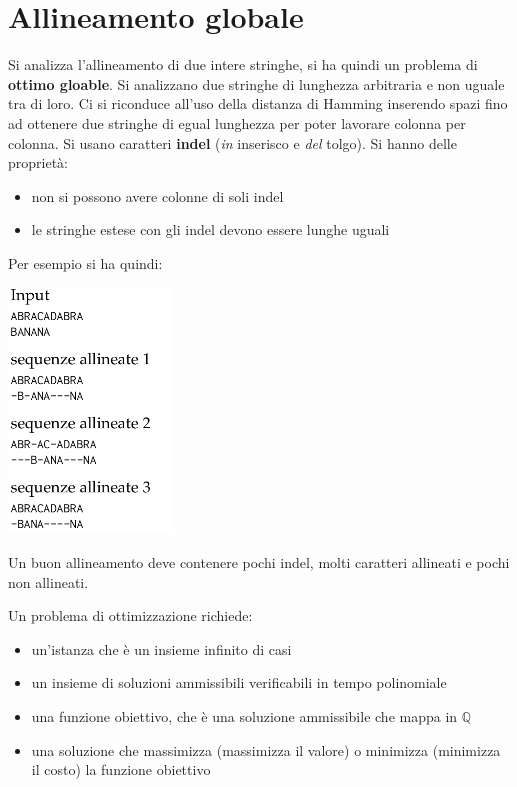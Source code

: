 \documentclass[a4paper,12pt, oneside]{book}
\begin{document}
\section{Allineamento globale}
Si analizza l'allineamento di due intere stringhe, si ha quindi un
problema di \textbf{ottimo gloable}. Si analizzano due stringhe di
lunghezza arbitraria e non uguale tra di loro. Ci si riconduce all'uso
della distanza di Hamming inserendo spazi fino ad ottenere due
stringhe di egual lunghezza per poter lavorare colonna per colonna.
Si usano caratteri \textbf{indel} (\textit{in} inserisco e
\textit{del} tolgo). Si hanno delle proprietà:
\begin{itemize}
  \item non si possono avere colonne di soli indel
  \item le stringhe estese con gli indel devono essere lunghe uguali
\end{itemize}
Per esempio si ha quindi:
\begin{center}
  \includegraphics[scale = 0.7]{img/indel.png}
\end{center}
Un buon allineamento deve contenere pochi indel, molti caratteri
allineati e pochi non allineati.\\
\begin{definizione}
  Un problema di ottimizzazione richiede:
  \begin{itemize}
    \item un'istanza che è un insieme infinito di casi
    \item un insieme di soluzioni ammissibili verificabili in tempo
    polinomiale
    \item una funzione obiettivo, che è una soluzione ammissibile che
    mappa in $\mathbb{Q}$
    \item una soluzione che massimizza (massimizza il valore) o
    minimizza (minimizza il costo) la funzione obiettivo
  \end{itemize}
\end{definizione}
\end{document}
